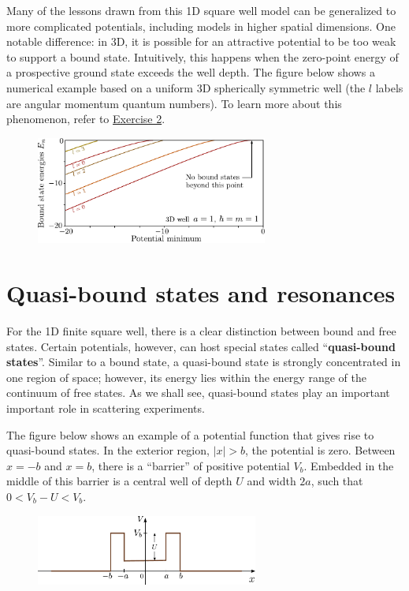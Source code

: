 \documentclass[pra,12pt]{revtex4}
\begin{document}
Many of the lessons drawn from this 1D square well model can be
generalized to more complicated potentials, including models in higher
spatial dimensions.  One notable difference: in 3D, it is possible for
an attractive potential to be too weak to support a bound state.
Intuitively, this happens when the zero-point energy of a prospective
ground state exceeds the well depth.  The figure below shows a
numerical example based on a uniform 3D spherically symmetric well
(the $l$ labels are angular momentum quantum numbers).  To learn more
about this phenomenon, refer to \hyperref[ex:boundstate3d]{Exercise
  2}.

\vskip 0.15in
\begin{figure}[h]
  \centering\includegraphics[width=0.68\textwidth]{boundstate3d}
\end{figure}

\section{Quasi-bound states and resonances}
\label{sec:resonances}

For the 1D finite square well, there is a clear distinction between
bound and free states.  Certain potentials, however, can host special
states called ``\textbf{quasi-bound states}''.  Similar to a bound
state, a quasi-bound state is strongly concentrated in one region of
space; however, its energy lies within the energy range of the
continuum of free states.  As we shall see, quasi-bound states play an
important important role in scattering experiments.

The figure below shows an example of a potential function that gives
rise to quasi-bound states.  In the exterior region, $|x| > b$, the
potential is zero.  Between $x = -b$ and $x = b$, there is a
``barrier'' of positive potential $V_b$.  Embedded in the middle of
this barrier is a central well of depth $U$ and width $2a$, such that
$0 < V_b - U < V_b$.

\begin{figure}[h]
  \centering\includegraphics[width=0.65\textwidth]{resonancewell}
\end{figure}
\end{document}
